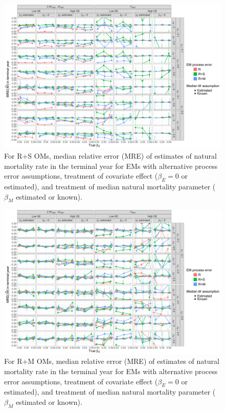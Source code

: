 \documentclass[
  12pt,
]{article}
\begin{document}
\begin{landscape}
\begin{figure}
\begin{center}
\includegraphics[height = \textheight]{terminal_year_M_bias_RSom}
\end{center}
\caption{For R+S OMs, median relative error (MRE) of estimates of natural mortality rate in the terminal year for EMs with alternative process error assumptions, treatment of covariate effect ($\beta_E = 0$ or estimated), and treatment of median natural mortality parameter ($\beta_M$ estimated or known).}\label{terminal_M_bias_RSom}
\end{figure}
\end{landscape}

\begin{landscape}
\begin{figure}
\begin{center}
\includegraphics[height = \textheight]{terminal_year_M_bias_RMom}
\end{center}
\caption{For R+M OMs, median relative error (MRE) of estimates of natural mortality rate in the terminal year for EMs with alternative process error assumptions, treatment of covariate effect ($\beta_E = 0$ or estimated), and treatment of median natural mortality parameter ($\beta_M$ estimated or known).}\label{terminal_M_bias_RMom}
\end{figure}
\end{landscape}
\end{document}
